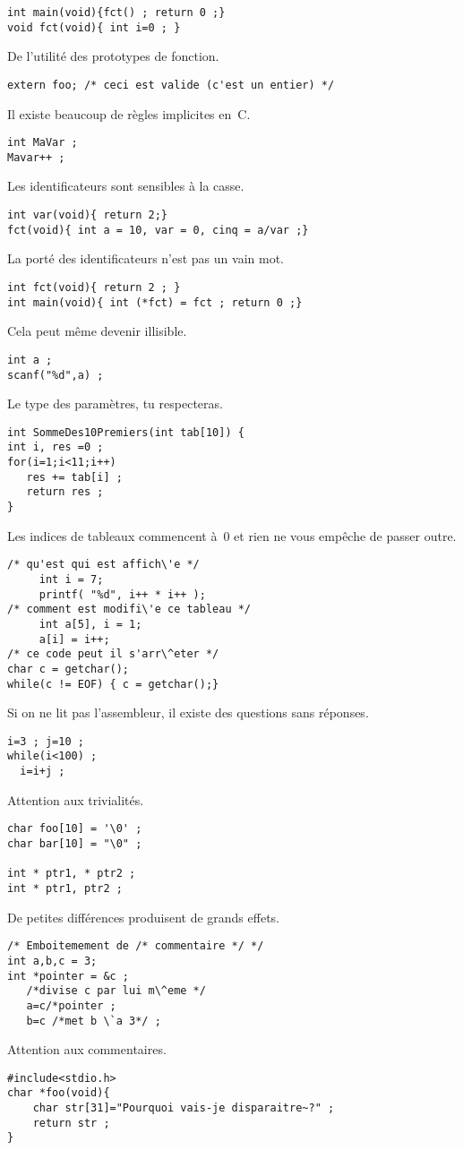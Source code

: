 \begin{frame}
\begin{verbatim}
int main(void){fct() ; return 0 ;}
void fct(void){ int i=0 ; }
\end{verbatim}
De l'utilit\'e des prototypes de fonction.
\newpage
\begin{verbatim}
extern foo; /* ceci est valide (c'est un entier) */
\end{verbatim}
Il existe beaucoup de r\`egles implicites en~C.
\begin{verbatim}
int MaVar ;
Mavar++ ;
\end{verbatim}
Les identificateurs sont sensibles \`a la casse.
\begin{verbatim}
int var(void){ return 2;}
fct(void){ int a = 10, var = 0, cinq = a/var ;}
\end{verbatim}
La port\'e des identificateurs n'est pas un vain mot.
\begin{verbatim}
int fct(void){ return 2 ; }
int main(void){ int (*fct) = fct ; return 0 ;}
\end{verbatim}
Cela peut m\^eme devenir illisible.
\begin{verbatim}
int a ;
scanf("%d",a) ;
\end{verbatim}
Le type des param\`etres, tu respecteras.
\newpage
\begin{verbatim}
int SommeDes10Premiers(int tab[10]) {
int i, res =0 ;
for(i=1;i<11;i++)
   res += tab[i] ;
   return res ;
}
\end{verbatim}
Les indices de tableaux commencent \`a~$0$ et rien ne vous emp\^eche
de passer outre.
\begin{verbatim}
/* qu'est qui est affich\'e */
     int i = 7;
     printf( "%d", i++ * i++ );
/* comment est modifi\'e ce tableau */
     int a[5], i = 1;
     a[i] = i++;
/* ce code peut il s'arr\^eter */
char c = getchar();
while(c != EOF) { c = getchar();}
\end{verbatim}
Si on ne lit pas l'assembleur, il existe des questions sans r\'eponses.
\newpage
\begin{verbatim}
i=3 ; j=10 ;
while(i<100) ;
  i=i+j ;
\end{verbatim}
Attention aux trivialit\'es.
\begin{verbatim}
char foo[10] = '\0' ;
char bar[10] = "\0" ;

int * ptr1, * ptr2 ; 
int * ptr1, ptr2 ;
\end{verbatim}
De petites  diff\'erences produisent de grands effets.
\begin{verbatim}
/* Emboitemement de /* commentaire */ */
int a,b,c = 3;
int *pointer = &c ;
   /*divise c par lui m\^eme */
   a=c/*pointer ;
   b=c /*met b \`a 3*/ ;
\end{verbatim}
Attention aux commentaires.
\newpage
\begin{verbatim}
#include<stdio.h>
char *foo(void){
    char str[31]="Pourquoi vais-je disparaitre~?" ;
    return str ;
}


\end{verbatim}
\end{frame}
